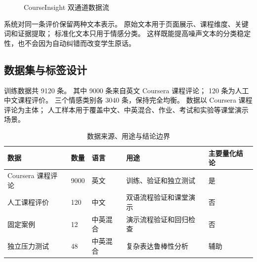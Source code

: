 \begin{figure}[H]
{}
  \caption{CourseInsight 双通道数据流}
  \label{fig:data-flow}
\end{figure}

系统对同一条评价保留两种文本表示。
原始文本用于页面展示、课程维度、关键词和证据提取；
标准化文本只用于情感分类。
这样既能提高噪声文本的分类稳定性，也不会因为自动纠错而改变学生原话。

\subsection{数据集与标签设计}

训练数据共 9120 条。
其中 9000 条来自英文 Coursera 课程评论\citep{huggingface_coursera_reviews}；
120 条为人工中文课程评价。
三个情感类别各 3040 条，保持完全均衡。
数据以 Coursera 课程评论为主体；
人工样本用于覆盖中文、中英混合、作业、考试和实验等课堂演示场景。

\begin{table}[H]
  \centering
  \caption{数据来源、用途与结论边界}
  \label{tab:dataset}
  \small
  \begin{tabularx}{\textwidth}{L{3.35cm} C{1.45cm} C{1.85cm} Y C{2.1cm}}
    \toprule
    数据 & 数量 & 语言 & 用途 & 主要量化结论 \\
    \midrule
    Coursera 课程评论 & 9000 & 英文 & 训练、验证和独立测试 & 是 \\
    人工课程评价 & 120 & 中文 & 双语流程验证和课堂演示 & 否 \\
    固定案例 & 12 & 中英混合 & 演示流程验证和回归检查 & 否 \\
    独立压力测试 & 48 & 中英混合 & 复杂表达鲁棒性分析 & 辅助 \\
    \bottomrule
  \end{tabularx}
\end{table}

